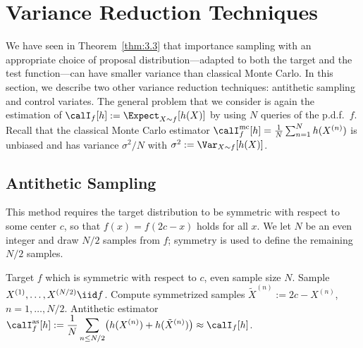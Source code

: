 
\section{Variance Reduction Techniques}
\label{sec:3.3}

We have seen in Theorem~\ref{thm:3.3} that importance sampling with an
appropriate choice of proposal distribution---adapted to both the target and the
test function---can have smaller variance than classical Monte Carlo. In this
section, we describe two other variance reduction techniques: antithetic sampling
and control variates. The general problem that we consider is again the
estimation of $\calI_f[h] := \Expect_{X \sim f}[h(X)]$ by using $N$ queries of
the p.d.f.\ $f$. Recall that the classical Monte Carlo estimator
$\calI_f^{\mathrm{mc}}[h] = \tfrac{1}{N}\sum_{n=1}^{N} h(X^{(n)})$ is unbiased
and has variance $\sigma^2/N$ with $\sigma^2 := \Var_{X \sim f}[h(X)]$.

\subsection{Antithetic Sampling}
\label{sec:3.3.1}

This method requires the target distribution to be symmetric with respect to
some center $c$, so that $f(x) = f(2c - x)$ holds for all $x$. We let $N$ be
an even integer and draw $N/2$ samples from $f$; symmetry is used to define the
remaining $N/2$ samples.

\begin{algorithm}[H]
\caption{Antithetic Sampling}
\label{alg:3.4}
\begin{algorithmic}[1]
\Require Target $f$ which is symmetric with respect to $c$, even sample size $N$.
\State Sample $X^{(1)}, \ldots, X^{(N/2)} \iid f$.
\State Compute symmetrized samples
  $\tilde{X}^{(n)} := 2c - X^{(n)}$, $n = 1,\ldots,N/2$.
\Ensure Antithetic estimator
  $\calI_f^{\mathrm{as}}[h]
   := \dfrac{1}{N}\displaystyle\sum_{n \leq N/2}
      \bigl(h(X^{(n)}) + h(\tilde{X}^{(n)})\bigr)
   \approx \calI_f[h]$.
\end{algorithmic}
\end{algorithm}

